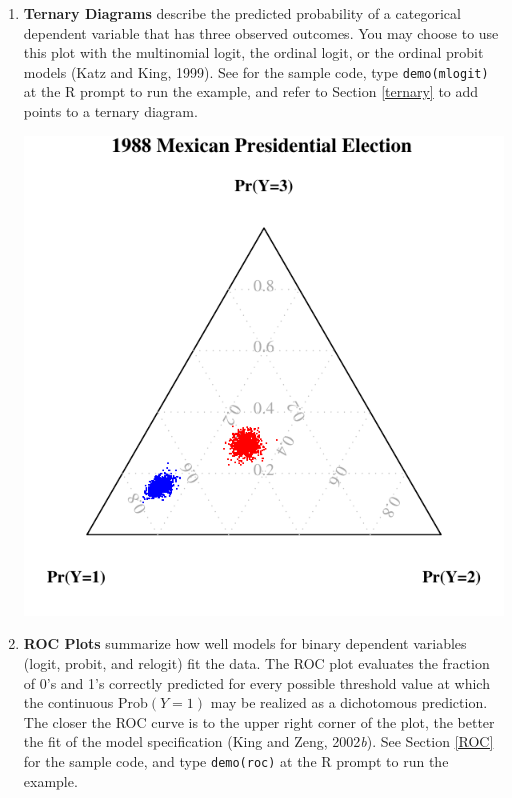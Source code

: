 \begin{enumerate}
  
\item {\bf Ternary Diagrams} describe the predicted probability of a
  categorical dependent variable that has three observed outcomes.
  You may choose to use this plot with the multinomial logit, the
  ordinal logit, or the ordinal probit models (Katz and King,
  1999).\nocite{KatKin99} See  for the sample code, type
  {\tt demo(mlogit)} at the R prompt to run the example, and refer to
  Section \ref{ternary} to add points to a ternary diagram.
  
\begin{center}
\includegraphics{figs/ternary}
\end{center}

\newpage

\item {\bf ROC Plots} summarize how well models for binary dependent
  variables (logit, probit, and relogit) fit the data.  The ROC plot
  evaluates the fraction of 0's and 1's correctly predicted for every
  possible threshold value at which the continuous Prob$(Y = 1)$ may
  be realized as a dichotomous prediction.  The closer the ROC curve
  is to the upper right corner of the plot, the better the fit of the
  model specification (King and Zeng, 2002\emph{b})\nocite{KinZen02}.
  See Section \ref{ROC} for the sample code, and type {\tt demo(roc)} at the
  R prompt to run the example.


\end{enumerate}
